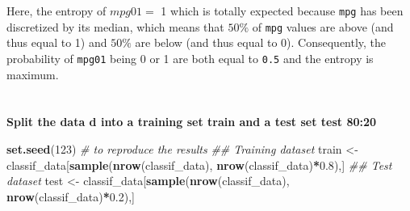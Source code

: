 \documentclass[
  12pt,
  oneside]{report}
\newenvironment{Shaded}{\begin{snugshade}}{\end{snugshade}}
\newcommand{\CommentTok}[1]{\textcolor[rgb]{0.56,0.35,0.01}{\textit{#1}}}
\newcommand{\DataTypeTok}[1]{\textcolor[rgb]{0.13,0.29,0.53}{#1}}
\newcommand{\DecValTok}[1]{\textcolor[rgb]{0.00,0.00,0.81}{#1}}
\newcommand{\FloatTok}[1]{\textcolor[rgb]{0.00,0.00,0.81}{#1}}
\newcommand{\KeywordTok}[1]{\textcolor[rgb]{0.13,0.29,0.53}{\textbf{#1}}}
\newcommand{\NormalTok}[1]{#1}
\newcommand{\OperatorTok}[1]{\textcolor[rgb]{0.81,0.36,0.00}{\textbf{#1}}}
\newcommand{\StringTok}[1]{\textcolor[rgb]{0.31,0.60,0.02}{#1}}
\begin{document}
\begin{Shaded}
\end{Shaded}

Here, the entropy of \(mpg01 =\) 1 which is totally expected because \texttt{mpg} has been discretized by its median, which means that \(50\%\) of \texttt{mpg} values are above (and thus equal to 1) and \(50\%\) are below (and thus equal to 0). Consequently, the probability of \texttt{mpg01} being 0 or 1 are both equal to \texttt{0.5} and the entropy is maximum.

\hypertarget{section-3}{%
\section{}\label{section-3}}

\textbf{Split the data d into a training set train and a test set test 80:20}

\begin{Shaded}
\begin{Highlighting}[]
\KeywordTok{set.seed}\NormalTok{(}\DecValTok{123}\NormalTok{) }\CommentTok{# to reproduce the results}
\CommentTok{## Training dataset}
\NormalTok{train <-}\StringTok{ }\NormalTok{classif_data[}\KeywordTok{sample}\NormalTok{(}\KeywordTok{nrow}\NormalTok{(classif_data), }\KeywordTok{nrow}\NormalTok{(classif_data)}\OperatorTok{*}\FloatTok{0.8}\NormalTok{),]}
\CommentTok{## Test dataset}
\NormalTok{test <-}\StringTok{ }\NormalTok{classif_data[}\KeywordTok{sample}\NormalTok{(}\KeywordTok{nrow}\NormalTok{(classif_data), }\KeywordTok{nrow}\NormalTok{(classif_data)}\OperatorTok{*}\FloatTok{0.2}\NormalTok{),]}
\end{Highlighting}
\end{Shaded}
\end{document}
